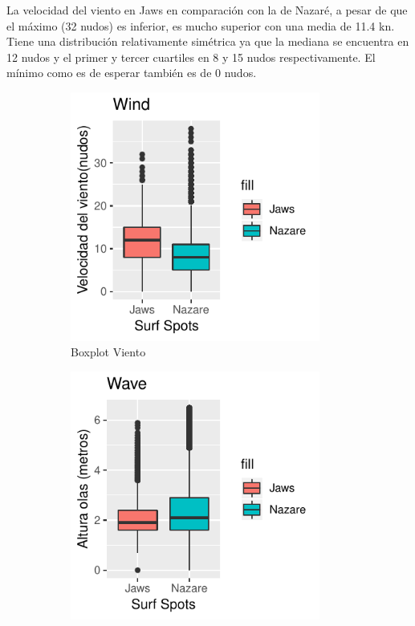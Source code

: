 La velocidad del viento en Jaws en comparación con la de Nazaré, a pesar de que el máximo (32 nudos) es inferior, es mucho superior con una media de 11.4 \si{\knot}. Tiene una distribución relativamente simétrica ya que la mediana se encuentra en 12 nudos y el primer y tercer cuartiles en 8 y 15 nudos respectivamente. El mínimo como es de esperar también es de 0 nudos.

\begin{figure}[H]
    \begin{subfigure}{.49\textwidth}
        \centering
        \includegraphics[width=0.9\textwidth]{./figures/boxplot_wind.pdf}
        \caption{Boxplot Viento}
        \label{fig:boxplot_wind}
    \end{subfigure}%
    \begin{subfigure}{.49\textwidth}
        \centering
        \includegraphics[width=0.9\textwidth]{./figures/boxplot_wave.pdf}

\end{subfigure}
\end{figure}
